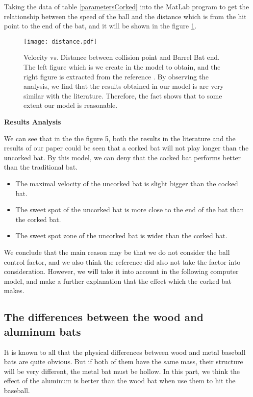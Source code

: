 Taking the data of table \ref{parametersCorked} into the MatLab program to get the relationship between the speed of the ball and the distance which is from the hit point to the end of the bat, and it will be shown in the figure \ref{VelocityDistance}.

\begin{figure}[!htb]
\centering
\texttt{[image: distance.pdf]}
\caption{\label{VelocityDistance}Velocity vs. Distance between collision point and Barrel Bat end.  The left figure which is we create in the model to obtain, and the right figure is extracted from the reference \cite{RemarksCorked}. By observing the analysis, we find that the results obtained in our model is are very similar with the literature. Therefore, the fact shows that to some extent our model is reasonable.}
\end{figure}


\textbf{Results Analysis}

We can see that in the the figure 5, both the results in the literature and the results of our paper could be seen that a corked bat will not play longer than the uncorked bat. By this model, we can deny that the cocked bat performs better than the traditional bat.

\begin{itemize}
\item The maximal velocity of the uncorked bat is slight bigger than the cocked bat.

\item The sweet spot of the uncorked bat is more close to the end of the bat than the corked bat.

\item The sweet spot zone of the uncorked bat is wider than the corked bat.
\end{itemize}

We conclude that the main reason may be that we do not consider the ball control factor, and we also think the reference did also not take the factor into consideration. However, we will take it into account in the following computer model, and make a further explanation that the effect which the corked bat makes.

\subsection{The differences between the wood and aluminum bats }

It is known to all that the physical differences between wood and metal baseball bats are quite obvious. But if both of them have the same mass, their structure will be very different, the metal bat must be hollow. In this part, we think the effect of the aluminum is better than the wood bat when use them to hit the baseball.

